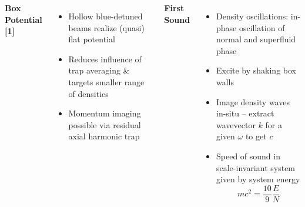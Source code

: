\documentclass[26pt, paperwidth=36in,paperheight=48in]{tikzposter} %
\newcommand{\myfont}{\fontsize{24}{30}\selectfont}
\begin{document}
\begin{columns}
{\begin{minipage}{0.15\textwidth}
	
\end{minipage}



\vspace{-0.0cm}
\begin{minipage}{0.14\textwidth}
	\flushleft
	\textbf{Box Potential [1]}
	\vspace{0.5cm}
	\myfont
	\begin{itemize}
		\item Hollow blue-detuned beams realize (quasi) flat potential
		
		\item Reduces influence of trap averaging \& targets smaller range of densities
		
		\item Momentum imaging possible via residual axial harmonic trap
		
	\end{itemize}
\end{minipage}
\hspace{0.2cm}
} 








\block[]{\textcolor{BEC1blue}{Density Response -- First Sound [2]}}
{
	\begin{minipage}{0.2\textwidth}
		\flushleft
		\vspace{0.5cm}
		\textbf{First Sound}
		\vspace{0.5cm}
		\myfont
		\begin{itemize}
			\item Density oscillations: in-phase oscillation of normal and superfluid phase
			
			\item Excite by shaking box walls
			
			\item Image density waves in-situ -- extract wavevector $k$ for a given $\omega$ to get $c$
			
			\item Speed of sound in scale-invariant system given by system energy $$mc^2 = \frac{10}{9} \frac{E}{N}$$
		\end{itemize}
		

\end{minipage}}
\end{columns}
\end{document}
